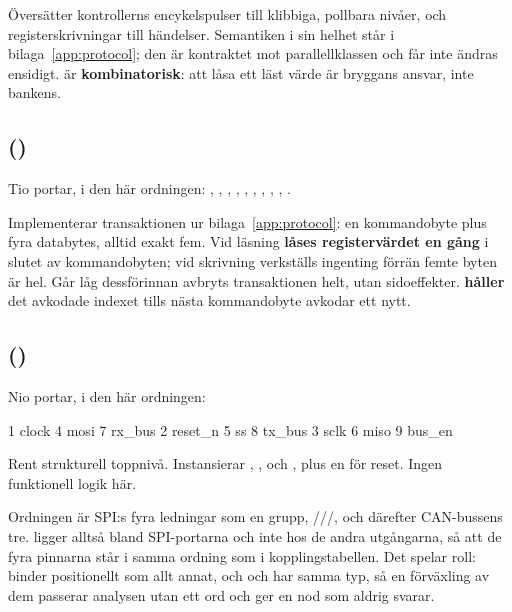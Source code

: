 Översätter kontrollerns encykelspulser till klibbiga, pollbara nivåer, och registerskrivningar till
händelser. Semantiken i sin helhet står i bilaga~\ref{app:protocol}; den är kontraktet mot
parallellklassen och får inte ändras ensidigt.  är \textbf{kombinatorisk}: att låsa
ett läst värde är bryggans ansvar, inte bankens.

\subsection*{ ()}
Tio portar, i den här ordningen: , , , ,
, , , , ,
.

Implementerar transaktionen ur bilaga~\ref{app:protocol}: en kommandobyte plus fyra databytes, alltid
exakt fem. Vid läsning \textbf{låses registervärdet en gång} i slutet av kommandobyten; vid skrivning
verkställs ingenting förrän femte byten är hel. Går  låg dessförinnan avbryts
transaktionen helt, utan sidoeffekter.  \textbf{håller} det avkodade indexet tills
nästa kommandobyte avkodar ett nytt.

\subsection*{ ()}
Nio portar, i den här ordningen:

\begin{textdrawing}
 1 clock      4 mosi     7 rx_bus
 2 reset_n    5 ss       8 tx_bus
 3 sclk       6 miso     9 bus_en
\end{textdrawing}

Rent strukturell toppnivå. Instansierar , ,
 och , plus en  för reset. Ingen funktionell
logik här.

Ordningen är SPI:s fyra ledningar som en grupp, ///, och
därefter CAN-bussens tre.  ligger alltså bland SPI-portarna och inte hos de andra
utgångarna, så att de fyra pinnarna står i samma ordning som i kopplingstabellen. Det spelar roll:
 binder positionellt som allt annat, och  och  har
samma typ, så en förväxling av dem passerar analysen utan ett ord och ger en nod som aldrig svarar.

